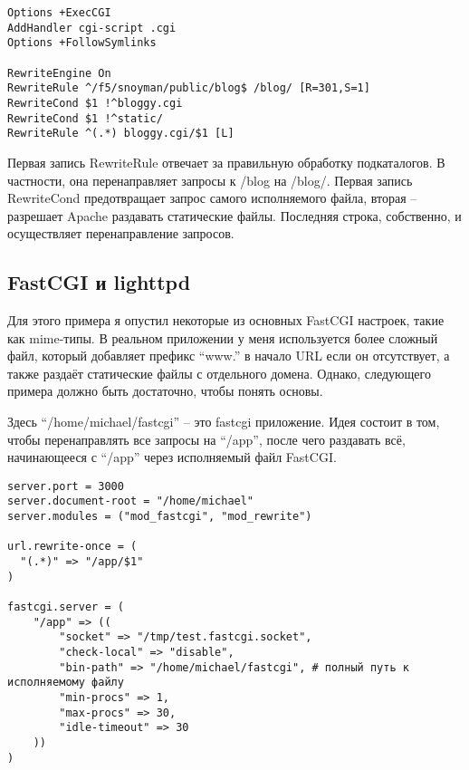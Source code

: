 \begin{lstlisting}
Options +ExecCGI
AddHandler cgi-script .cgi
Options +FollowSymlinks

RewriteEngine On
RewriteRule ^/f5/snoyman/public/blog$ /blog/ [R=301,S=1]
RewriteCond $1 !^bloggy.cgi
RewriteCond $1 !^static/
RewriteRule ^(.*) bloggy.cgi/$1 [L]
\end{lstlisting}
%

Первая запись RewriteRule отвечает за правильную обработку подкаталогов. В частности, она перенаправляет запросы к /blog на /blog/. Первая запись RewriteCond предотвращает запрос самого исполняемого файла, вторая -- разрешает Apache раздавать статические файлы. Последняя строка, собственно, и осуществляет перенаправление запросов.
%
\subsection{FastCGI и lighttpd}
%
%

Для этого примера я опустил некоторые из основных FastCGI настроек, такие как mime-типы. В реальном приложении у меня используется более сложный файл, который добавляет префикс ``www.'' в начало URL если он отсутствует, а также раздаёт статические файлы с отдельного домена. Однако, следующего примера должно быть достаточно, чтобы понять основы.

Здесь ``/home/michael/fastcgi'' -- это fastcgi приложение. Идея состоит в том, чтобы перенаправлять все запросы на ``/app'', после чего раздавать всё, начинающееся с ``/app'' через исполняемый файл FastCGI.
%
\begin{lstlisting}
server.port = 3000
server.document-root = "/home/michael"
server.modules = ("mod_fastcgi", "mod_rewrite")

url.rewrite-once = (
  "(.*)" => "/app/$1"
)

fastcgi.server = (
    "/app" => ((
        "socket" => "/tmp/test.fastcgi.socket",
        "check-local" => "disable",
        "bin-path" => "/home/michael/fastcgi", # полный путь к исполняемому файлу
        "min-procs" => 1,
        "max-procs" => 30,
        "idle-timeout" => 30
    ))
)
\end{lstlisting}
%
